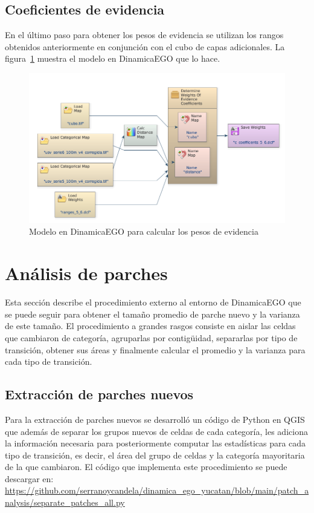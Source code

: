 \documentclass[12pt,a4paper,oldfontcommands]{article}
\begin{document}
\subsection{Coeficientes de evidencia}
En el último paso para obtener los pesos de evidencia se utilizan los rangos obtenidos anteriormente en conjunción con el cubo de capas adicionales. La figura~\ref{fig:evidence} muestra el modelo en DinamicaEGO que lo hace.
\begin{figure}[h]
	\centering
	\includegraphics[width=1\textwidth]{./figuras/evidence.png}
	\caption{Modelo en DinamicaEGO para calcular los pesos de evidencia}
	\label{fig:evidence}
\end{figure}
\section{Análisis de parches}
Esta sección describe el procedimiento externo al entorno de DinamicaEGO que se puede seguir para obtener el tamaño promedio de parche nuevo y la varianza de este tamaño. El procedimiento a grandes rasgos consiste en aislar las celdas que cambiaron de categoría, agruparlas por contigüidad, separarlas por tipo de transición, obtener sus áreas y finalmente calcular el promedio y la varianza para cada tipo de transición.
\subsection{Extracción de parches nuevos}
Para la extracción de parches nuevos se desarrolló un código de Python en QGIS que además de separar los grupos nuevos de celdas de cada categoría, les adiciona la información necesaria para posteriormente computar las estadísticas para cada tipo de transición, es decir, el área del grupo de celdas y la categoría mayoritaria de la que cambiaron. El código que implementa este procedimiento se puede descargar en: \url{https://github.com/serranoycandela/dinamica_ego_yucatan/blob/main/patch_analysis/separate_patches_all.py}
\end{document}
